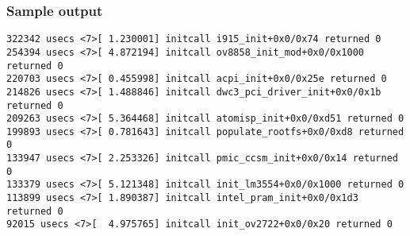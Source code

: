 \begin{frame}[fragile]
	\frametitle{Sample output}
	\begin{adjustwidth}{-2em}{-2em}
\begin{Verbatim}[fontsize=\footnotesize]
322342 usecs <7>[ 1.230001] initcall i915_init+0x0/0x74 returned 0
254394 usecs <7>[ 4.872194] initcall ov8858_init_mod+0x0/0x1000 returned 0
220703 usecs <7>[ 0.455998] initcall acpi_init+0x0/0x25e returned 0
214826 usecs <7>[ 1.488846] initcall dwc3_pci_driver_init+0x0/0x1b returned 0
209263 usecs <7>[ 5.364468] initcall atomisp_init+0x0/0xd51 returned 0
199893 usecs <7>[ 0.781643] initcall populate_rootfs+0x0/0xd8 returned 0
133947 usecs <7>[ 2.253326] initcall pmic_ccsm_init+0x0/0x14 returned 0
133379 usecs <7>[ 5.121348] initcall init_lm3554+0x0/0x1000 returned 0
113899 usecs <7>[ 1.890387] initcall intel_pram_init+0x0/0x1d3 returned 0
92015 usecs <7>[  4.975765] initcall init_ov2722+0x0/0x20 returned 0
\end{Verbatim}
	\end{adjustwidth}

\end{frame}

